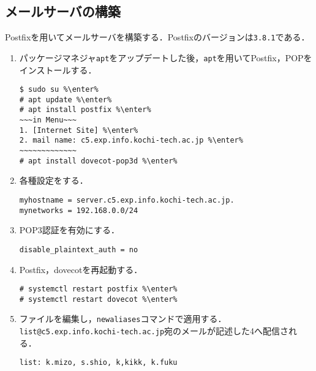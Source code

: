 \subsection{メールサーバの構築}
Postfixを用いてメールサーバを構築する．Postfixのバージョンは\texttt{3.8.1}である．
\begin{enumerate}
    \renewcommand{\labelenumi}{\textbf{\theenumi.}\ }
    \item パッケージマネジャ\texttt{apt}をアップデートした後，\texttt{apt}を用いてPostfix，POPをインストールする．
          \begin{lstlisting}
$ sudo su %\enter%
# apt update %\enter%
# apt install postfix %\enter%
~~~in Menu~~~
1. [Internet Site] %\enter%
2. mail name: c5.exp.info.kochi-tech.ac.jp %\enter%
~~~~~~~~~~~~~
# apt install dovecot-pop3d %\enter%
\end{lstlisting}
    \item 各種設定をする．
          \begin{lstlisting}[style=file,caption={\ttfamily /etc/postfix/main.cf}]
myhostname = server.c5.exp.info.kochi-tech.ac.jp.
mynetworks = 192.168.0.0/24
    \end{lstlisting}
    \item POP3認証を有効にする．
          \begin{lstlisting}[style=file,caption={\ttfamily /etc/dovecot/conf.d/10-auth.conf}]
disable_plaintext_auth = no
\end{lstlisting}
    \item Postfix，dovecotを再起動する．
          \begin{lstlisting}
# systemctl restart postfix %\enter%
# systemctl restart dovecot %\enter%
    \end{lstlisting}
    \item \aliases ファイルを編集し，\texttt{newaliases}コマンドで適用する．\texttt{list@c5.exp.info.kochi-tech.ac.jp}宛のメールが記述した4\user へ配信される．
          \begin{lstlisting}[style=file,caption={\ttfamily /etc/aliases}]
list: k.mizo, s.shio, k,kikk, k.fuku
    \end{lstlisting}
\end{enumerate}
\clearpage
